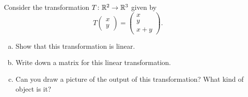 \documentclass[12pt]{article} %
\begin{document}
\newpage
\begin{problem}
Consider the transformation $T\colon \mathbb{R}^2 \to \mathbb{R}^3$ given by
\[
T \begin{pmatrix} x \\ y \end{pmatrix} = \begin{pmatrix} x \\ y \\ x+y \end{pmatrix}.
\]
\begin{enumerate}[(a)]
    \item Show that this transformation is linear.
    \item Write down a matrix for this linear transformation.
    \item Can you draw a picture of the output of this transformation? What kind of object is it?
\end{enumerate}
\end{problem}
\end{document}
